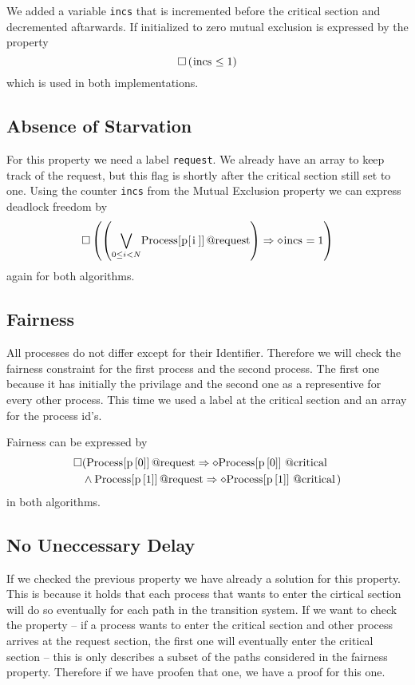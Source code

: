 \documentclass{llncs}
\begin{document}
We added a variable \lstinline|incs| that is incremented before the critical section
and decremented aftarwards. If initialized to zero mutual exclusion is expressed by the
property
\begin{equation}
    \square \left( \text{\lstinline|incs|} \leq 1 \right)
\end{equation}
which is used in both implementations.

\subsection{Absence of Starvation}

For this property we need a label \lstinline|request|. We already have an array to keep track of the request,
but this flag is shortly after the critical section still set to one.
Using the counter \lstinline|incs| from the Mutual Exclusion property we can express deadlock freedom by
\begin{equation}
    \square \left( \left( \underset{0\leq i < N}{\bigvee} \text{\lstinline|Process[p[i]]@request|}\right) \Rightarrow \diamond \text{\lstinline|incs|} = 1 \right)
\end{equation}
again for both algorithms.
\subsection{Fairness}

All processes do not differ except for their Identifier. Therefore we will check the fairness constraint for the first process and the second process.
The first one because it has initially the privilage and the second one as a representive for every other process.
This time we used a label at the critical section and an array for the process id's.

Fairness can be expressed by
\begin{eqnarray}
    \square & ( \text{\lstinline|Process[p[0]]@request|} \Rightarrow \diamond \text{\lstinline|Process[p[0]]@critical|} \\
    &\land \text{\lstinline|Process[p[1]]@request|}\Rightarrow \diamond \text{\lstinline|Process[p[1]]@critical|})
\end{eqnarray}
in both algorithms.

\subsection{No Uneccessary Delay}

If we checked the previous property we have already a solution for this property.
This is because it holds that each process that wants to enter the cirtical section will do so eventually for each path in
the transition system.
If we want to check the property -- if a process wants to enter the critical section and other process arrives at the request section,
the first one will eventually enter the critical section -- this is only describes a subset of the paths considered in the fairness property.
Therefore if we have proofen that one, we have a proof for this one.
\end{document}
